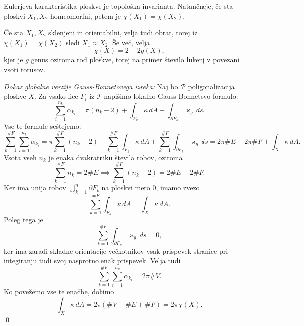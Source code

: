 \begin{izrek}
\label{izr_Eulerjeva_karakteristika_je_topoloska_invarianta}
Eulerjeva karakteristika ploskve je topološka invarianta. Natančneje, če sta ploskvi $X_1, X_2$ homeomorfni, potem 
je $\chi(X_1) = \chi(X_2)$. 
\end{izrek}

Če sta $X_1, X_2$ sklenjeni in orientabilni, velja tudi obrat, torej iz $\chi(X_1) = \chi(X_2)$ sledi $X_1 \approx X_2$. Še več, velja \begin{equation*}
\chi(X) = 2 - 2g(X),
\end{equation*}  
kjer je $g$ genus oziroma rod ploskve, torej na primer število lukenj v povezani vsoti torusov.

\noindent
{\em Dokaz globalne verzije Gauss-Bonnetovega izreka:\/}
Naj bo $\mathcal{P}$ poligonalizacija ploskve $X$. Za vsako lice $F_i$ iz $\mathcal{P}$ napišimo lokalno Gauss-Bonnetovo formulo:
\begin{equation*}
\sum_{i = 1}^{n_k} \alpha_{k_i} = \pi(n_k - 2) + \int_{F_k} \kappa \, dA + \int_{\partial F_k } \varkappa_g \, ds.  
\end{equation*}  
Vse te formule seštejemo: \begin{equation*}
\sum_{k = 1}^{\#F} \sum_{i = 1}^{n_k} \alpha_{k_i} = \pi \sum_{k = 1}^{\#F}  (n_k - 2) + \sum_{k = 1}^{\#F}  \int_{F_k} \kappa \, dA + \sum_{k = 1}^{\#F}  \int_{\partial F_k } \varkappa_g \, ds = 2 \pi \#E - 2\pi \# F + \int_{X} \kappa \, dA. 
\end{equation*}  
Vsota vseh $n_k$ je enaka dvakratniku števila robov, oziroma \begin{equation*}
    \sum_{k = 1}^{\#F} n_k = 2 \# E \implies \sum_{k = 1}^{\#F}  (n_k - 2) = 2 \# E - 2 \# F.
\end{equation*}  
  Ker ima unija robov $\bigcup_{k = 1}^{n} \partial F_k$ na ploskvi mero $0$, imamo zvezo \begin{equation*}
    \sum_{k = 1}^{\#F}  \int_{F_k} \kappa \, dA = \int_{X} \kappa \, dA.  
  \end{equation*}  
Poleg tega je\begin{equation*}
    \sum_{k = 1}^{\#F} \int_{\partial F_k} \varkappa_g \, ds = 0, 
\end{equation*}  
ker ima zaradi skladne orientacije večkotnikov vsak prispevek stranice pri integiranju tudi svoj nasprotno enak prispevek. 
Velja tudi \begin{equation*}
    \sum_{k = 1}^{\#F} \sum_{i = 1}^{n_k} \alpha_{k_i} = 2 \pi \# V.
\end{equation*}  
Ko povežemo vse te enačbe, dobimo \begin{equation*}
\int_{X} \kappa \, dA = 2 \pi (\# V - \# E + \# F ) = 2 \pi \chi(X). 
\end{equation*} 
 \qed

